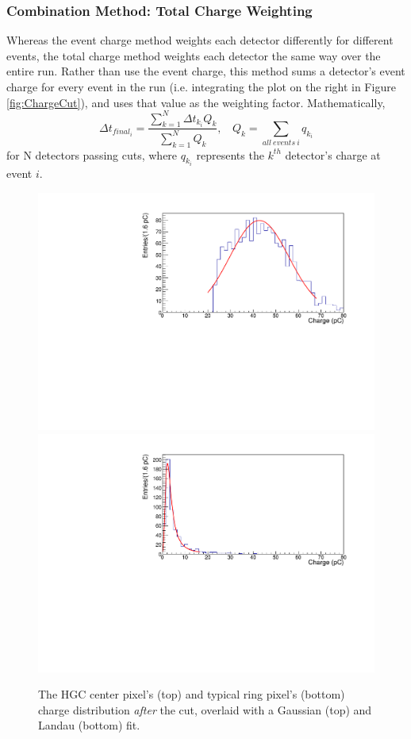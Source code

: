\documentclass[twocolumn,aps,prd,reprint,superscriptaddress,floatfix]{revtex4-1}
\begin{document}
\subsubsection{Combination Method: Total Charge Weighting}
Whereas the event charge method weights each detector differently for different events, the total charge method weights each detector the same way over the entire run. 
Rather than use the event charge, this method sums a detector's event charge for every event in the run (i.e. integrating the plot on the right in Figure \ref{fig:ChargeCut}), and uses that value as the weighting factor. 
Mathematically,
\[
\Delta t_{final_i} =
\dfrac{\sum\limits_{k=1}^N \Delta t_{k_i} Q_k }
	{\sum\limits_{k=1}^N Q_k }
,\ \ \ \ 
Q_k = \sum_{all\ events\ i} q_{k_i}
\]
for N detectors passing cuts, where $q_{k_i}$ represents the $k^{th}$ detector's charge at event $i$.

\begin{figure}[!htbp]
	\centering
	\includegraphics[width=\linewidth]{mpvgaus.pdf}
	\includegraphics[width=\linewidth]{mpvlandau.pdf}
	\caption{The HGC center pixel's (top) and typical ring pixel's (bottom) charge distribution \textit{after} the cut, overlaid with a Gaussian (top) and Landau (bottom) fit.}
    \label{fig:MPV}
\end{figure}
\end{document}
